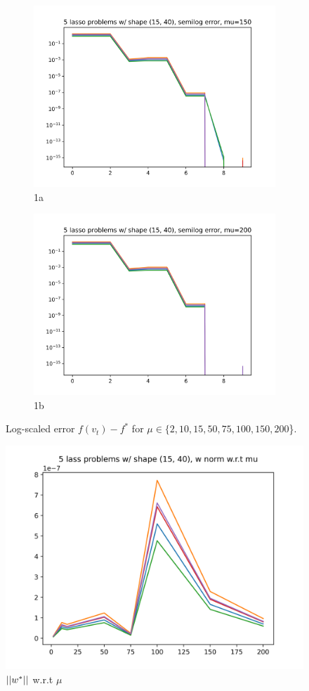 \documentclass{article}
\DeclarePairedDelimiter\norm{||}{||}
\begin{document}
{\begin{figure}
\begin{subfigure}{.5\textwidth}
  \centering
  \includegraphics[width=.8\linewidth]{lasso_qp_150.png}
  \caption{1a}
  \label{fig:sfig1}
\end{subfigure}%
\begin{subfigure}{.5\textwidth}
  \centering
  \includegraphics[width=.8\linewidth]{lasso_qp_200.png}
  \caption{1b}
  \label{fig:sfig2}
\end{subfigure}
\caption{Log-scaled error $f(v_t)-f^*$ for $\mu\in \{2, 10, 15, 50, 75, 100, 150, 200$\}.}
\label{fig:fig}
\end{figure}
}
%
\begin{figure}
    \centering
    \includegraphics{lass_qp_norm_mus.png}
    \caption{$\norm{w^*}$ w.r.t $\mu$}
    \label{fig:enter-label}
\end{figure}
\end{document}
